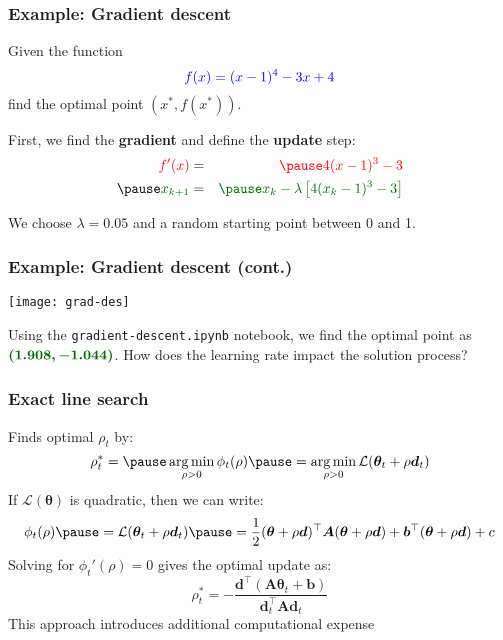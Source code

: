 \documentclass[smaller]{beamer}
\DeclareMathOperator*{\argmin}{arg\,min}
\newcommand{\lt}{\left}
\newcommand{\rt}{\right}
\newcommand{\?}{\stackrel{?}{=}}
\newcommand{\fr}{\frac}
\newcommand{\rd}{\color{red}}
\newcommand{\bl}{\color{blue}}
\newcommand{\gr}{\color{green!40!black}}
\renewcommand{\th}{\theta}
\newcommand{\mc}{\mathcal}
\newcommand{\tr}{^{\top}}
\newcommand{\pe}{\pause}
\begin{document}
\begin{frame}
  \frametitle{Example: Gradient descent }\pause
  Given the function \pause
  \begin{equation*}
    \bl f(x) = (x-1)^4 - 3x + 4
  \end{equation*}
  \pause
  find the optimal point $(x^*, f(x^*))$.\pause

  \bigskip

  First, we find the \textbf{\rd gradient} and define the \textbf{\gr update} step:\pause
  \begin{eqnarray*}
    \rd f'(x) &=& \rd \pause 4(x-1)^3 - 3 \\ \pause
    \gr x_{k+1} &=&\gr \pause x_k - \lambda \lt[4(x_k -1)^3 - 3  \rt] 
  \end{eqnarray*}

  We choose $\lambda = 0.05$ and a random starting point between 0 and 1.
\end{frame}

\begin{frame}
  \frametitle{Example: Gradient descent  (cont.)}
  \pause
  \begin{center}
    \texttt{[image: grad-des]}
  \end{center}
  Using the \texttt{gradient-descent.ipynb} notebook, we find the optimal point as $\gr\bm{(1.908,-1.044)}$. \pause
  {\rd How does the learning rate impact the solution process?}
\end{frame}


\begin{frame}
  \frametitle{Exact line search}
  \pe
  Finds optimal  $\rho_{t}$ by:\pe
    \begin{equation}
      \rho_{t}^{*} = \pause \argmin_{\rho>0} \phi_{t}(\rho)  \pe =  \argmin_{\rho>0} \mc{L}(\bm\th_{t} + \rho\bm d_{t})
    \end{equation}
    \pe
    If $\mc{L}(\bm\th)$ is quadratic, then we can write:\pe
    \begin{equation}
      \phi_{t}(\rho) \pe= \mc{L}(\bm\th_{t} + \rho\bm d_{t}) \pe= \fr12(\bm\th + \rho\bm d)\tr\bm A(\bm\th + \rho\bm d) + \bm b\tr(\bm\th + \rho\bm d) + c
    \end{equation}
    \pe
    Solving for $\phi_{t}'(\rho) = 0$ gives the optimal update as: \pe
    \begin{equation}
      \rho_{t}^{*} = -\fr{\bm d\tr (\bm A\bm\th_{t} + \bm b)}{\bm d_{t}\tr\bm A\bm d_{t}}
    \end{equation}
    \pe
    This approach introduces additional computational expense
  \end{frame}
\end{document}
